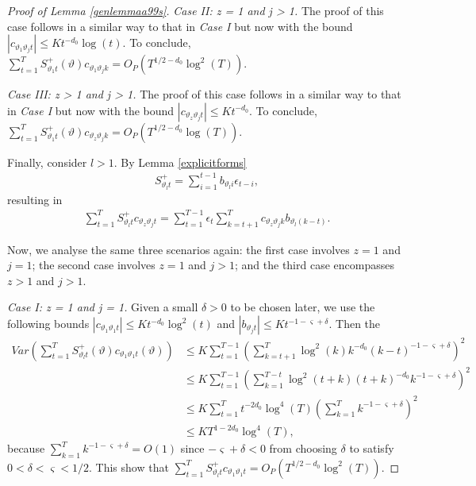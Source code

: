 {{\begin{proof}[Proof of Lemma \ref{genlemmaa99s}]
\textit{Case II: z = 1 and j > 1.} The proof of this case follows in a similar way to that in \textit{Case I} but now with the bound $|c_{\vartheta_1 \vartheta_j t}| \leq K t^{-d_0} \log(t)$. To conclude, $\sum_{t = 1}^{T} S_{\vartheta_1 t}^+(\vartheta)  c_{\vartheta_1 \vartheta_j k} = O_P(T^{1/2-d_0} \log^2(T)) $.

\textit{Case III: z > 1 and j > 1.} The proof of this case follows in a similar way to that in \textit{Case I} but now with the bound $|c_{\vartheta_z \vartheta_j t}| \leq K t^{-d_0}$. To conclude, $\sum_{t = 1}^{T} S_{\vartheta_1 t}^+(\vartheta)  c_{\vartheta_z \vartheta_j k} = O_P(T^{1/2-d_0} \log(T)) $.


Finally, consider $l > 1$. By Lemma \ref{explicitforms} 
\begin{align*}
S^+_{\vartheta_l t} = \sum_{i = 1}^{t-1} b_{\vartheta_li} \epsilon_{t-i}, 
\end{align*}
resulting in
\begin{align*}
    \sum_{t = 1}^{T} S_{\vartheta_l t}^+  c_{\vartheta_z \vartheta_j  t} = \sum_{t = 1}^{T-1} \epsilon_t \sum_{k = t+1}^T c_{\vartheta_z \vartheta_j k}  b_{\vartheta_l(k-t)}.
\end{align*}


Now, we analyse the same three scenarios again: the first case involves $z = 1$ and $j = 1$; the second case involves $z = 1$ and $j>1$; and the third case encompasses $z>1$ and $j > 1$.

\textit{Case I: z = 1 and j = 1.} Given a small $\delta > 0$ to be chosen later, we use the following bounds $|c_{\vartheta_1 \vartheta_1 t}| \leq K t^{-d_0} \log^2(t)$ and $|b_{\vartheta_j t}| \leq Kt^{-1-\varsigma+\delta}$. Then the 
\begin{align*}
      Var(\sum_{t = 1}^{T} S_{\vartheta_l t}^+(\vartheta) c_{\vartheta_1 \vartheta_1 t}(\vartheta)) &\leq K \sum_{t = 1}^{T-1} \left( \sum_{k =t+1}^T \log^2(k) k^{-d_0}  (k-t)^{-1-\varsigma+\delta} \right)^2 \\  
    &\leq K \sum_{t = 1}^{T-1} \left( \sum_{k = 1}^{T-t} \log^2(t+k)(t+k)^{-d_0}  k^{-1-\varsigma+\delta} \right)^2 \\  
    &\leq K \sum_{t = 1}^{T} t^{-2d_0} \log^4(T) \left( \sum_{k = 1}^{T}   k^{-1-\varsigma+\delta} \right)^2 \\ 
    &\leq K  T^{1-2d_0} \log^4(T),
\end{align*}
because $\sum_{k = 1}^{T}   k^{-1-\varsigma+\delta} = O(1)$ since $-\varsigma+\delta < 0$ from choosing $\delta$ to satisfy $0< \delta < \varsigma < 1/2$. This show that $\sum_{t = 1}^{T} S_{\vartheta_l t}^+ c_{\vartheta_1 \vartheta_1 t} = O_P( T^{1/2-d_0} \log^2(T))$.


\end{proof}}}
